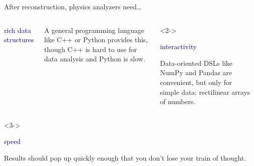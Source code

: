 \documentclass[aspectratio=169]{beamer}
\begin{document}

\begin{frame}{After reconstruction, physics analyzers need\ldots}
\Large

\begin{columns}
\begin{center}
\textcolor{darkblue}{\LARGE rich data structures}
\end{center}

A general programming language like C++ or Python provides this, though C++ is hard to use for data analysis and Python is slow.

\begin{uncoverenv}<2->
\begin{center}
\textcolor{darkblue}{\LARGE interactivity}
\end{center}

Data-oriented DSLs like NumPy and Pandas are convenient, but only for simple data: rectilinear arrays of numbers.
\end{uncoverenv}
\end{columns}

\vspace{0.25 cm}
\begin{columns}
\begin{uncoverenv}<3->
\begin{center}
\textcolor{darkblue}{\LARGE speed}
\end{center}

Results should pop up quickly enough that you don't lose your train of thought.
\end{uncoverenv}
\end{columns}
\end{frame}
\end{document}
